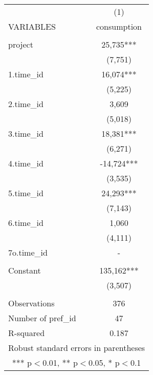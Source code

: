 \documentclass[]{article}
\begin{document}
\begin{tabular}{lc} \hline
 & (1) \\
VARIABLES & consumption \\ \hline
 &  \\
project & 25,735*** \\
 & (7,751) \\
1.time\_id & 16,074*** \\
 & (5,225) \\
2.time\_id & 3,609 \\
 & (5,018) \\
3.time\_id & 18,381*** \\
 & (6,271) \\
4.time\_id & -14,724*** \\
 & (3,535) \\
5.time\_id & 24,293*** \\
 & (7,143) \\
6.time\_id & 1,060 \\
 & (4,111) \\
7o.time\_id & - \\
 &  \\
Constant & 135,162*** \\
 & (3,507) \\
 &  \\
Observations & 376 \\
Number of pref\_id & 47 \\
 R-squared & 0.187 \\ \hline
\multicolumn{2}{c}{ Robust standard errors in parentheses} \\
\multicolumn{2}{c}{ *** p$<$0.01, ** p$<$0.05, * p$<$0.1} \\
\end{tabular}
\end{document}
